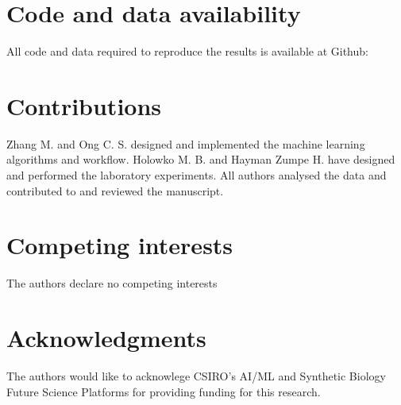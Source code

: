 \documentclass{article}
\begin{document}
\section*{Code and data availability}

All code and data required to reproduce the results is available at Github: 

\section*{Contributions}
Zhang M. and Ong C. S. designed and implemented the machine learning algorithms and workflow. Holowko M. B. and Hayman Zumpe H. have designed and performed the laboratory experiments. All authors analysed the data and contributed to and reviewed the manuscript.

\section*{Competing interests}
The authors declare no competing interests

\section*{Acknowledgments}
The authors would like to acknowlege CSIRO's AI/ML and Synthetic Biology Future Science Platforms for providing funding for this research.


\newpage

\printbibliography

\clearpage

\appendix

\end{document}
